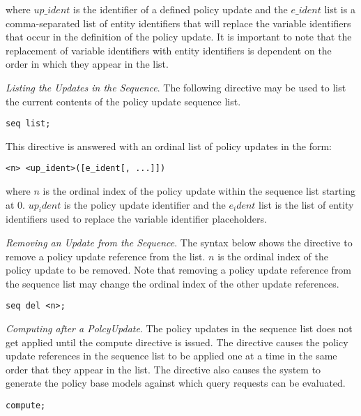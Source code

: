 \documentclass[10pt, twocolumn]{article}
\begin{document}
        where $up\_ident$ is the identifier of a defined policy update and 
        the $e\_ident$ list is a comma-separated list of entity identifiers
        that will replace the variable identifiers that occur in the
        definition of the policy update. It is important to note that the
        replacement of variable identifiers with entity identifiers is
        dependent on the order in which they appear in the list.

        \emph{Listing the Updates in the Sequence}. The following directive may
        be used to list the current contents of the policy update sequence
        list.

        \begin{verbatim}seq list;\end{verbatim}

        This directive is answered with an ordinal list of policy updates in
        the form:

        \begin{verbatim}<n> <up_ident>([e_ident[, ...]])\end{verbatim}

        where $n$ is the ordinal index of the policy update within the sequence
        list starting at 0. $up_ident$ is the policy update identifier and the
        $e_ident$ list is the list of entity identifiers used to replace the
        variable identifier placeholders.

        \emph{Removing an Update from the Sequence}. The syntax below shows the
        directive to remove a policy update reference from the list. $n$ is the
        ordinal index of the policy update to be removed. Note that removing
        a policy update reference from the sequence list may change the ordinal
        index of the other update references.

        \begin{verbatim}seq del <n>;\end{verbatim}

      \emph{Computing after a PolcyUpdate}. The policy updates in the sequence
      list does not get applied until the compute directive is issued. The
      directive causes the policy update references in the sequence list to be
      applied one at a time in the same order that they appear in the list. The
      directive also causes the system to generate the policy base models
      against which query requests can be evaluated.

      \begin{verbatim}compute;\end{verbatim}
\end{document}

